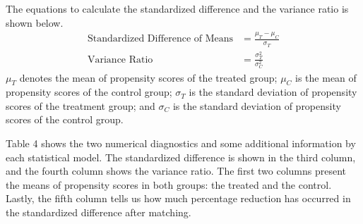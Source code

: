 \documentclass[11pt,a4paper,oneside]{article}
\begin{document}
\par
The equations to calculate the standardized difference and the variance ratio is shown below.
\begin{align*}
    \text{Standardized Difference of Means} &= \frac{\mu_{T} - \mu_{C}}{\sigma_{T}}\\
    \text{Variance Ratio} &= \frac{\sigma^{2}_{T}}{\sigma^{2}_{C}}
\end{align*}
$\mu_{T}$ denotes the mean of propensity scores of the treated group; $\mu_{C}$ is the mean of propensity scores of the control group; $\sigma_{T}$ is the standard deviation of propensity scores of the treatment group; and $\sigma_{C}$ is the standard deviation of propensity scores of the control group.
\par
Table 4 shows the two numerical diagnostics and some additional information by each statistical model. The standardized difference is shown in the third column, and the fourth column shows the variance ratio. The first two columns present the means of propensity scores in both groups: the treated and the control. Lastly, the fifth column tells us how much percentage reduction has occurred in the standardized difference after matching.
\end{document}
